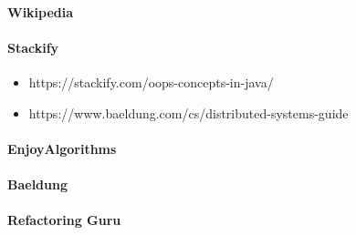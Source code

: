 \documentclass{article}
\begin{document}
    \paragraph{Wikipedia}
    \paragraph{Stackify}
        \begin{itemize}
            \item https://stackify.com/oops-concepts-in-java/
            \item https://www.baeldung.com/cs/distributed-systems-guide
        \end{itemize} 
    \paragraph{EnjoyAlgorithms}
    \paragraph{Baeldung}
    \paragraph{Refactoring Guru}
            
            
            
\end{document}
